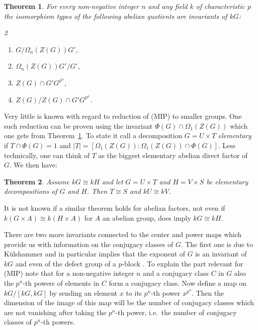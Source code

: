 \documentclass[11pt, a4paper]{amsart}
\newtheorem{theorem}{Theorem}[section]
\theoremstyle{definition}
\begin{document}
\begin{theorem}\label{th:OmegaAndAgemo} \cite{MargolisSakuraiStanojkovski21} For every non-negative integer $n$ and any field $k$ of characteristic $p$ the isomorphism types of the following abelian quotients are invariants of $kG$:
	\begin{multicols}{2}
		\begin{enumerate}
			\item\label{it:invariants1} $G/\Omega_n(Z(G))G'$,
			\item\label{it:invariants2} $\Omega_n(Z(G))G'/G'$,
			\columnbreak
			\item\label{it:invariants3} $Z(G)\cap G'G^{p^n}$,
			\item\label{it:invariants4} $Z(G)/Z(G)\cap G'G^{p^n}$.
		\end{enumerate}
	\end{multicols}
\end{theorem}

Very little is known with regard to reduction of (MIP) to smaller groups. One such reduction can be proven using the invariant $\Phi(G) \cap \Omega_1(Z(G))$ which one gets from Theorem~\ref{th:OmegaAndAgemo}. To state it call a decomposition $G = U \times T$ \emph{elementary} if $T \cap \Phi(G) = 1$ and $|T| = [\Omega_1(Z(G)): \Omega_1(Z(G)) \cap \Phi(G) ]$. Less technically, one can think of $T$ as the biggest elementary abelian direct factor of $G$. We then have:

\begin{theorem}\cite{MargolisSakuraiStanojkovski21}
Assume $kG \cong kH$ and let $G = U \times T$ and $H = V \times S$ be elementary decompositions of $G$ and $H$. Then $T \cong S$ and $kU \cong kV$.
\end{theorem}

It is not known if a similar theorem holds for abelian factors, not even if $k(G \times A) \cong k(H \times A)$ for $A$ an abelian group, does imply $kG \cong kH$.

There are two more invariants connected to the center and power maps which provide us with information on the conjugacy classes of $G$. The first one is due to K\"ulshammer and in particular implies that the exponent of $G$ is an invariant of $kG$ and even of the defect group of a $p$-block \cite{Kuelshammer82}. To explain the part relevant for (MIP) note that for a non-negative integer $n$ and a conjugacy class $C$ in $G$ also the $p^n$-th powers of elements in $C$ form a conjugacy class. Now define a map on $kG/[kG,kG]$ by sending an element $x$ to its $p^{n}$-th power $x^{p^n}$. Then the dimension of the image of this map will be the number of conjugacy classes which are not vanishing after taking the $p^n$-th power, i.e.\ the number of conjugacy classes of $p^n$-th powers.  
\end{document}
